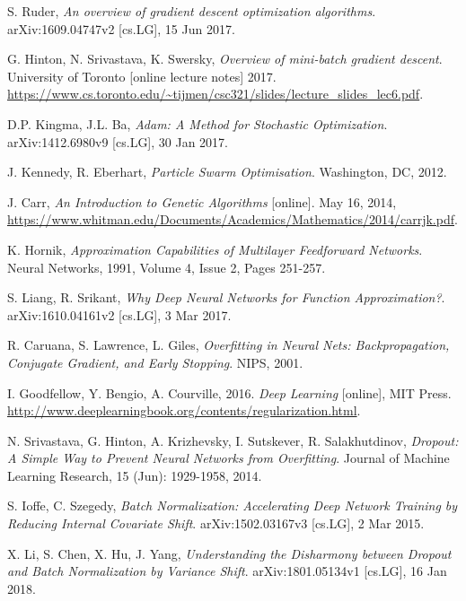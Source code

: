 \documentclass[a4paper]{article}
\begin{document}
\begin{thebibliography}{999}

  S. Ruder,
  \emph{An overview of gradient descent optimization algorithms}.
  arXiv:1609.04747v2 [cs.LG],
  15 Jun 2017.

  G. Hinton, N. Srivastava, K. Swersky,
  \emph{Overview of mini-batch gradient descent}.
  University of Toronto
  [online lecture notes]
  2017.
  \url{https://www.cs.toronto.edu/~tijmen/csc321/slides/lecture_slides_lec6.pdf}.

  D.P. Kingma, J.L. Ba,
  \emph{Adam: A Method for Stochastic Optimization}.
  arXiv:1412.6980v9 [cs.LG],
  30 Jan 2017.

  J. Kennedy, R. Eberhart,
  \emph{Particle Swarm Optimisation}.
  Washington, DC,
  2012.

  J. Carr,
  \emph{An Introduction to Genetic Algorithms}
  [online].
  May 16, 2014,
  \url{https://www.whitman.edu/Documents/Academics/Mathematics/2014/carrjk.pdf}.

  K. Hornik,
  \emph{Approximation Capabilities of Multilayer Feedforward Networks}.
  Neural Networks,
  1991,
  Volume 4,
  Issue 2,
  Pages 251-257.

  S. Liang, R. Srikant,
  \emph{Why Deep Neural Networks for Function Approximation?}.
  arXiv:1610.04161v2 [cs.LG],
  3 Mar 2017.

  R. Caruana, S. Lawrence, L. Giles,
  \emph{Overfitting in Neural Nets: Backpropagation, Conjugate Gradient, and Early Stopping}.
  NIPS,
  2001.

  I. Goodfellow, Y. Bengio, A. Courville,
  2016.
  \emph{Deep Learning}
  [online],
  MIT Press.
  \url{http://www.deeplearningbook.org/contents/regularization.html}.

  N. Srivastava, G. Hinton, A. Krizhevsky, I. Sutskever, R. Salakhutdinov,
  \emph{Dropout: A Simple Way to Prevent Neural Networks from Overfitting}.
  Journal of Machine Learning Research, 
  15 (Jun): 1929-1958, 2014.

  S. Ioffe, C. Szegedy,
  \emph{Batch Normalization: Accelerating Deep Network Training by Reducing Internal Covariate Shift}.
  arXiv:1502.03167v3 [cs.LG],
  2 Mar 2015.

X. Li, S. Chen, X. Hu, J. Yang,
\emph{Understanding the Disharmony between Dropout and Batch Normalization by Variance Shift}.
arXiv:1801.05134v1 [cs.LG],
16 Jan 2018.


\end{thebibliography}
\end{document}

